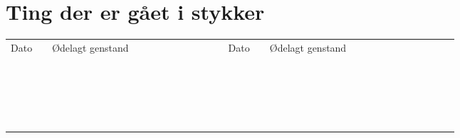 \section{Ting der er gået i stykker}
\begin{table}[H]
\centering
\begin{tabular}{|l|l|l|l|l}
\cline{1-4}
Dato~~ & Ødelagt genstand~~~~~~~~~~~~~~~~~~ & Dato~~ & Ødelagt genstand ~~~~~~~~~~~~~~~~~~ &  \\ \cline{1-4}
     &                  &      &                  &  \\ \cline{1-4}
     &                  &      &                  &  \\ \cline{1-4}
     &                  &      &                  &  \\ \cline{1-4}
     &                  &      &                  &  \\ \cline{1-4}
     &                  &      &                  &  \\ \cline{1-4}
     &                  &      &                  &  \\ \cline{1-4}
     &                  &      &                  &  \\ \cline{1-4}
     &                  &      &                  &  \\ \cline{1-4}
     &                  &      &                  &  \\ \cline{1-4} 
     &                  &      &                  &  \\ \cline{1-4}
     &                  &      &                  &  \\ \cline{1-4}
     &                  &      &                  &  \\ \cline{1-4}
     &                  &      &                  &  \\ \cline{1-4}
     &                  &      &                  &  \\ \cline{1-4}
     &                  &      &                  &  \\ \cline{1-4}
     &                  &      &                  &  \\ \cline{1-4}
     &                  &      &                  &  \\ \cline{1-4}
     &                  &      &                  &  \\ \cline{1-4} 
     &                  &      &                  &  \\ \cline{1-4}
     &                  &      &                  &  \\ \cline{1-4}

\end{tabular}
\end{table}
